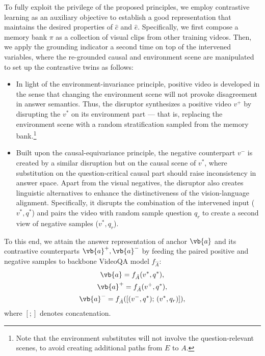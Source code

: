 To fully exploit the privilege of the proposed principles, we employ contrastive learning as an auxiliary objective to establish a good representation that maintains the desired properties of $\hat{c}$ and $\hat{e}$. 
Specifically, we first compose a memory bank $\pi$ as a collection of visual clips from other training videos. Then, we apply the grounding indicator a second time on top of the intervened variables, where the re-grounded causal and environment scene are manipulated to set up the contrastive twins as follows:
\begin{itemize}[leftmargin=*]
\item In light of the environment-invariance principle, positive video is developed in the sense that changing the environment scene will not provoke disagreement in answer semantics.  Thus, the disruptor synthesizes a positive video $v^+$ by disrupting the $v^*$ on its environment part --- that is, replacing the environment scene with a random stratification sampled from the memory bank.\footnote{Note that the environment substitutes will not involve the question-relevant scenes, to avoid creating additional paths from $E$ to $A$.}  
\item Built upon the causal-equivariance principle, the negative counterpart $v^-$ is created by a similar disruption but on the causal scene of $v^*$, where substitution on the question-critical causal part should raise inconsistency in answer space.
%
Apart from the visual negatives, the disruptor also creates linguistic alternatives to enhance the distinctiveness of the vision-language alignment. Specifically, it disrupts the combination of the intervened input ($v^*, q^*$) and pairs the video with random sample question $q_r$ to create a second view of negative samples ($v^*, q_r$).
\end{itemize}
To this end, we attain the answer representation of anchor $\vb{a}$ and its contrastive counterparts $\vb{a}^+, \vb{a}^-$ by feeding the paired positive and negative samples to backbone VideoQA model $f_{\hat{A}}$: 
\begin{gather}
    \vb{a}=f_{\hat{A}}(v^*,q^*),\\
    \vb{a}^+=f_{\hat{A}}(v^+,q^*),\\
    \vb{a}^-=f_{\hat{A}}([(v^-,q^*);\,(v^*,q_r)]),
\end{gather}
where $[;]$ denotes concatenation.

